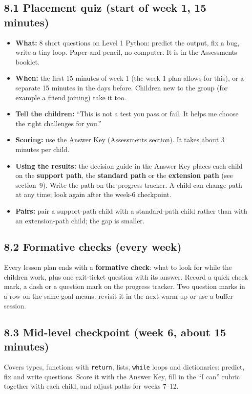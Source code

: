 \documentclass[level=2,teacher]{kidscode}
\begin{document}
\subsection{8.1 Placement quiz (start of week 1, 15 minutes)}
\begin{itemize}[itemsep=1pt]
  \item \textbf{What:} 8 short questions on Level 1 Python: predict the output, fix a bug, write a
        tiny loop. Paper and pencil, no computer. It is in the Assessments booklet.
  \item \textbf{When:} the first 15 minutes of week 1 (the week 1 plan allows for this), or a
        separate 15 minutes in the days before. Children new to the group (for example a friend
        joining) take it too.
  \item \textbf{Tell the children:} \enquote{This is not a test you pass or fail. It helps me choose
        the right challenges for you.}
  \item \textbf{Scoring:} use the Answer Key (Assessments section). It takes about 3 minutes per child.
  \item \textbf{Using the results:} the decision guide in the Answer Key places each child on the
        \textbf{support path}, the \textbf{standard path} or the \textbf{extension path}
        (see section~9). Write the path on the progress tracker. A child can change path at any
        time; look again after the week-6 checkpoint.
  \item \textbf{Pairs:} pair a support-path child with a standard-path child rather than with an
        extension-path child; the gap is smaller.
\end{itemize}

\subsection{8.2 Formative checks (every week)}
Every lesson plan ends with a \textbf{formative check}: what to look for while the children work,
plus one exit-ticket question with its answer. Record a quick check mark, a dash or a question mark on
the progress tracker. Two question marks in a row on the same goal means: revisit it in the next
warm-up or use a buffer session.

\subsection{8.3 Mid-level checkpoint (week 6, about 15 minutes)}
Covers types, functions with \texttt{return}, lists, \texttt{while} loops and dictionaries:
predict, fix and write questions. Score it with the Answer Key, fill in the \enquote{I can} rubric
together with each child, and adjust paths for weeks 7--12.
\end{document}
